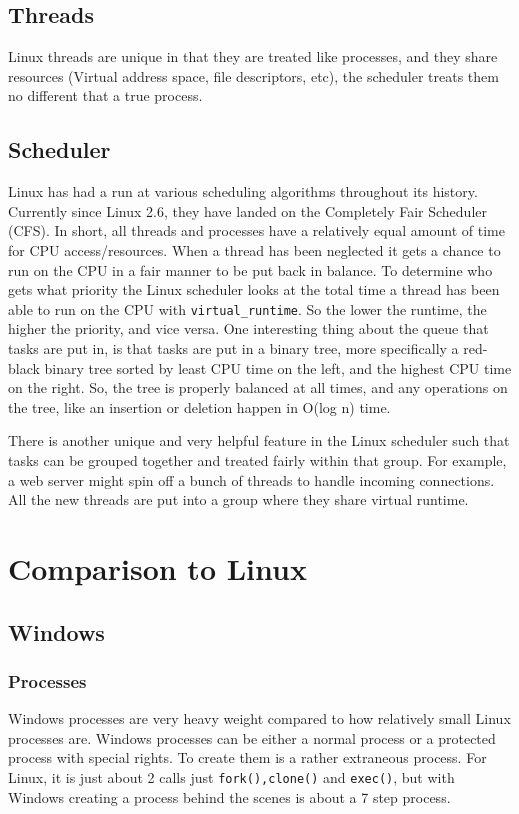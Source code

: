 \documentclass[10pt,conference,draftclsnofoot,onecolumn]{IEEEtran}
\begin{document}
\subsection{Threads}
    Linux threads are unique in that they are treated like processes, and they share resources (Virtual address space, file descriptors, etc), the scheduler treats them no different that a true process. 
    
\subsection{Scheduler}

    Linux has had a run at various scheduling algorithms throughout its history. Currently since Linux 2.6, they have landed on the Completely Fair Scheduler (CFS). In short, all threads and processes have a relatively equal amount of time for CPU access/resources. When a thread has been neglected it gets a chance to run on the CPU in a fair manner to be put back in balance. \cite{4} To determine who gets what priority the Linux scheduler looks at the total time a thread has been able to run on the CPU with \texttt{virtual\_runtime}. So the lower the runtime, the higher the priority, and vice versa. One interesting thing about the queue that tasks are put in, is that tasks are put in a binary tree, more specifically a red-black binary tree sorted by least CPU time on the left, and the highest CPU time on the right. So, the tree is properly balanced at all times, and any operations on the tree, like an insertion or deletion happen in O(log n) time. \cite{4}

    There is another unique and very helpful feature in the Linux scheduler such that tasks can be grouped together and treated fairly within that group. For example, a web server might spin off a bunch of threads to handle incoming connections. All the new threads are put into a group where they share virtual runtime. \cite{4}
    
\newpage
    
\section{Comparison to Linux}
    \subsection{Windows}
        \subsubsection{Processes}
        Windows processes are very heavy weight compared to how relatively small Linux processes are. Windows processes can be either a normal process or a protected process with special rights. To create them is a rather extraneous process. For Linux, it is just about 2 calls just \texttt{fork(),clone()} and \texttt{exec()}, but with Windows creating a process behind the scenes is about a 7 step process\cite{1}.\\
\end{document}
